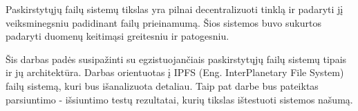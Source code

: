 Paskirstytųjų failų sistemų tikslas yra pilnai decentralizuoti tinklą ir padaryti jį veiksminegsniu padidinant failų prieinamumą. Šios sistemos buvo sukurtos padaryti duomenų keitimąsi greitesniu ir patogesniu.

Šis darbas padės susipažinti su egzistuojančiais paskirstytųjų failų sistemų tipais ir jų architektūra. Darbas orientuotas į IPFS (Eng. InterPlanetary File System) failų sistemą, kuri bus išanalizuota detaliau. Taip pat darbe bus pateiktas parsiuntimo - išsiuntimo testų rezultatai, kurių tikslas ištestuoti sistemos našumą.